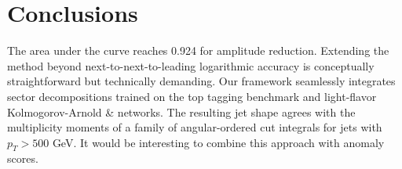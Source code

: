 \section{Conclusions}\label{sec:conclusions}

The area under the curve reaches 0.924 for amplitude reduction.
Extending the method beyond next-to-next-to-leading logarithmic accuracy
is conceptually straightforward but technically demanding. Our framework
seamlessly integrates sector decompositions trained on the top tagging
benchmark and light-flavor Kolmogorov-Arnold & networks. The resulting jet
shape agrees with the multiplicity moments of a family of
angular-ordered cut integrals for jets with $p_T > 500$ GeV. It would be
interesting to combine this approach with anomaly scores.

